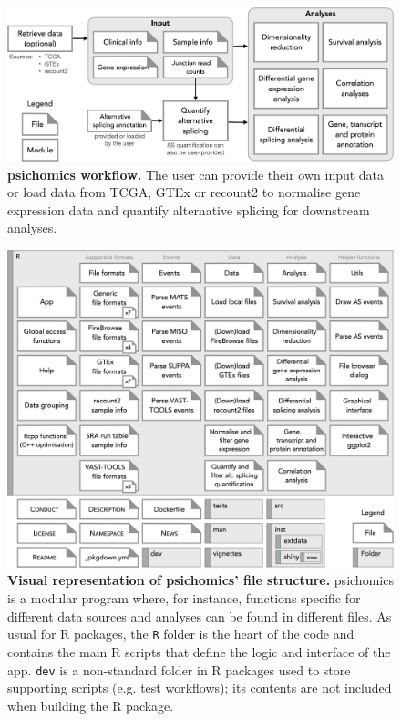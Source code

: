 \begin{figure}[!ht]
  \includegraphics[width=.94\textwidth]{images/psichomics/workflow}
  \centering
  \caption[psichomics workflow]{\textbf{psichomics workflow.} The user can provide their own input data or load data from TCGA, GTEx or recount2 to normalise gene expression data and quantify alternative splicing for downstream analyses.}
  \label{fig:psichomics-workflow}
\end{figure}

\begin{figure}[!h]
  \includegraphics[width=\textwidth]{images/psichomics/file-structure}
  \centering
  \caption[psichomics file structure]{\textbf{Visual representation of psichomics' file structure.} psichomics is a modular program where, for instance, functions specific for different data sources and analyses can be found in different files. As usual for R packages, the \texttt{R} folder is the heart of the code and contains the main R scripts that define the logic and interface of the app. \texttt{dev} is a non-standard folder in R packages used to store supporting scripts (e.g. test workflows); its contents are not included when building the R package.}
  \label{fig:psichomics-file-structure}
\end{figure}

